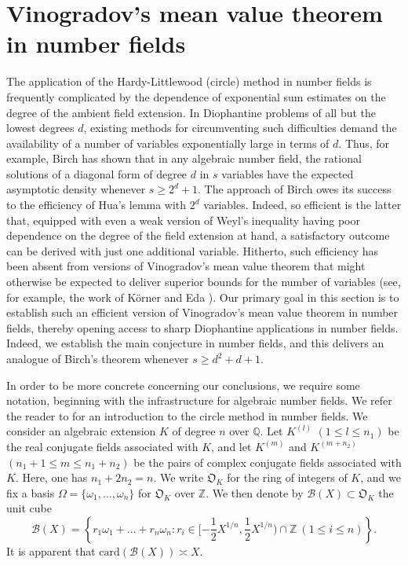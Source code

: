 \documentclass[12pt,reqno]{amsart}
\theoremstyle{definition}
\theoremstyle{remark}
\numberwithin{equation}{section}
\def\calB{{\mathcal B}} \def\calBtil{{\widetilde \calB}}
\def\dbZ{{\mathbb Z}}\def\dbQ{{\mathbb Q}}
\def\grO{{\mathfrak O}}
\def\ome{{\omega}} \def\Ome{{\Omega}}
\def\le{\leqslant} \def\ge{\geqslant} \def\pleq{\preccurlyeq} \def\ple{\prec}
\begin{document}
\section{Vinogradov's mean value theorem in number fields} The application of the 
Hardy-Littlewood (circle) method in number fields is frequently complicated by the 
dependence of exponential sum estimates on the degree of the ambient field extension. In 
Diophantine problems of all but the lowest degrees $d$, existing methods for circumventing 
such difficulties demand the availability of a number of variables exponentially large in terms 
of $d$. Thus, for example, Birch \cite{Bir1961} has shown that in any algebraic number 
field, the rational solutions of a diagonal form of degree $d$ in $s$ variables have the 
expected asymptotic density whenever $s\ge 2^d+1$. The approach of Birch owes its 
success to the efficiency of Hua's lemma with $2^d$ variables. Indeed, so efficient is the 
latter that, equipped with even a weak version of Weyl's inequality having poor dependence 
on the degree of the field extension at hand, a satisfactory outcome can be derived with 
just one additional variable. Hitherto, such efficiency has been absent from versions of 
Vinogradov's mean value theorem that might otherwise be expected to deliver superior 
bounds for the number of variables (see, for example, the work of K\"orner \cite{Kor1962} 
and Eda \cite{Eda1967}). Our primary goal in this section is to establish such an efficient 
version of Vinogradov's mean value theorem in number fields, thereby opening access to 
sharp Diophantine applications in number fields. Indeed, we establish the main conjecture in 
number fields, and this delivers an analogue of Birch's theorem whenever $s\ge d^2+d+1$.

\par In order to be more concrete concerning our conclusions, we require some notation, 
beginning with the infrastructure for algebraic number fields. We refer the reader to 
\cite{Wan1991} for an introduction to the circle method in number fields. We consider an 
algebraic extension $K$ of degree $n$ over $\dbQ$. Let $K^{(l)}$ $(1\le l\le n_1)$ be 
the real conjugate fields associated with $K$, and let $K^{(m)}$ and $K^{(m+n_2)}$ 
$(n_1+1\le m\le n_1+n_2)$ be the pairs of complex conjugate fields associated with $K$. 
Here, one has $n_1+2n_2=n$. We write $\grO_K$ for the ring of integers of $K$, and we 
fix a basis $\Ome =\{\ome_1,\ldots ,\ome_n\}$ for $\grO_K$ over $\dbZ$. We then denote 
by $\calB(X)\subset \grO_K$ the unit cube
$$\calB(X)=\left\{ r_1\ome_1+\ldots +r_n\ome_n: r_i\in 
[-{\textstyle{\frac{1}{2}}}X^{1/n},{\textstyle{\frac{1}{2}}}X^{1/n})\cap \dbZ\ 
(1\le i\le n)\right\}.$$
It is apparent that $\text{card}(\calB(X))\asymp X$.\par
\end{document}
